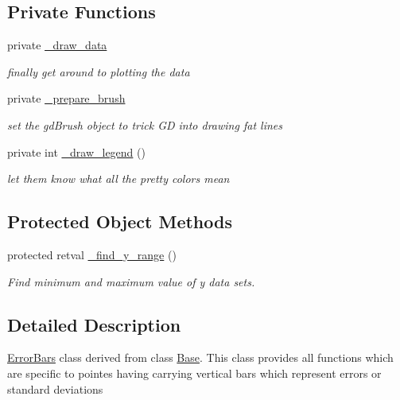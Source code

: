\subsection*{Private Functions}
\label{_amgrp8d29cff216bafa3117e21883ea7c6b5f}
 \begin{DoxyCompactItemize}
\item 
private \hyperlink{classChart_1_1ErrorBars_a33bedf80072c9d80170ff8f3f36813d7}{\_\-draw\_\-data}
\begin{DoxyCompactList}\small\item\em finally get around to plotting the data \item\end{DoxyCompactList}\item 
private \hyperlink{classChart_1_1ErrorBars_aaa3c8ac81fb6af31970112a9780bc825}{\_\-prepare\_\-brush}
\begin{DoxyCompactList}\small\item\em set the gdBrush object to trick GD into drawing fat lines \item\end{DoxyCompactList}\item 
private int \hyperlink{classChart_1_1ErrorBars_a6e1e40b048bbc13bead8449c2b78750a}{\_\-draw\_\-legend} ()
\begin{DoxyCompactList}\small\item\em let them know what all the pretty colors mean \item\end{DoxyCompactList}\end{DoxyCompactItemize}
\subsection*{Protected Object Methods}
\label{_amgrp06e02ce997685862181738d6a83b6f25}
 \begin{DoxyCompactItemize}
\item 
protected retval \hyperlink{classChart_1_1ErrorBars_aa303b7b246e29f54626fecebfe6cf15c}{\_\-find\_\-y\_\-range} ()
\begin{DoxyCompactList}\small\item\em Find minimum and maximum value of y data sets. \item\end{DoxyCompactList}\end{DoxyCompactItemize}


\subsection{Detailed Description}
\hyperlink{classChart_1_1ErrorBars}{ErrorBars} class derived from class \hyperlink{classChart_1_1Base}{Base}. This class provides all functions which are specific to pointes having carrying vertical bars which represent errors or standard deviations 

